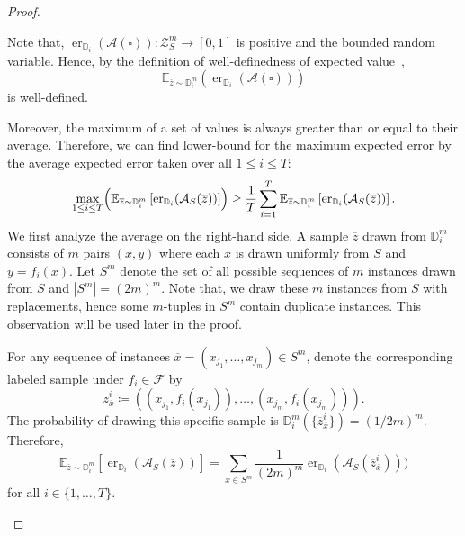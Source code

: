 \begin{proof}
\begin{subproof}
        Note that, $\operatorname{er}_{\mathbb{D}_i}(\mathcal{A}(\square)): \mathcal{Z}_S^m\to [0,1]$ is positive and the bounded random variable. Hence, by the definition of well-definedness of expected value~\cite[Def 8.3]{MeasureTheoryLeGall},
        \[
            \mathbb{E}_{\overline{z} \sim \mathbb{D}_i^m}(\operatorname{er}_{\mathbb{D}_i}(\mathcal{A}(\square)))
        \]
        is well-defined.

        Moreover, the maximum of a set of values is always greater than or equal to their average. Therefore, we can find lower-bound for the maximum expected error by the average expected error taken over all $1 \leq i \leq T$:
        \[
            \max_{1 \leq i \leq T} \Bigl( \mathbb{E}_{\overline{z} \sim \mathbb{D}_i^m} \left[ \operatorname{er}_{\mathbb{D}_i}(\mathcal{A}_S(\overline{z})) \right]\Bigr) \ge \frac{1}{T} \sum_{i = 1}^{T} \mathbb{E}_{\overline{z} \sim \mathbb{D}_i^m} \left[ \operatorname{er}_{\mathbb{D}_i}(\mathcal{A}_S(\overline{z})) \right].
        \]
        We first analyze the average on the right-hand side. A sample $\overline{z}$ drawn from $\mathbb{D}_i^m$ consists of $m$ pairs $(x,y)$ where each $x$ is drawn uniformly from $S$ and $y=f_i(x)$. Let $S^m$ denote the set of all possible sequences of $m$ instances drawn from $S$ and $|S^m| = (2m)^m$. Note that, we draw these $m$ instances from $S$ with replacements, hence some $m$-tuples in $S^m$ contain duplicate instances. This observation will be used later in the proof.

        For any sequence of instances $\overline{x} = (x_{j_1}, \dots, x_{j_m}) \in S^m$, denote the corresponding labeled sample under $f_i\in \mathcal{F}$ by
        \[
            \overline{z}_{\overline{x}}^{i} \coloneq ((x_{j_1}, f_i(x_{j_1})), \dots, (x_{j_m}, f_i(x_{j_m}))).
        \]
        The probability of drawing this specific sample is $\mathbb{D}_i^m(\{\overline{z}_{\overline{x}}^{i}\}) = (1/2m)^m$. Therefore,
        \[
            \mathbb{E}_{\overline{z} \sim \mathbb{D}_i^m} \left[ \operatorname{er}_{\mathbb{D}_i}(\mathcal{A}_S(\overline{z})) \right] = \sum_{\overline{x} \in S^m} \frac{1}{(2m)^m} \operatorname{er}_{\mathbb{D}_i}(\mathcal{A}_S(\overline{z}_{\overline{x}}^{i})))
        \]
        for all $i \in \{1, \dots, T\}$.


\end{subproof}
\end{proof}

